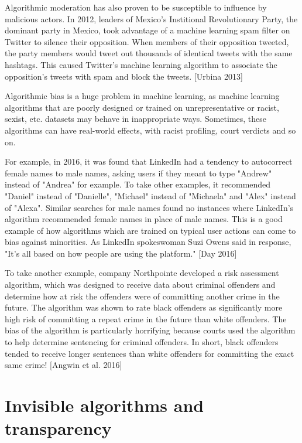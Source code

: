 \documentclass[class=book, crop=false]{standalone}
\begin{document}
Algorithmic moderation has also proven to be susceptible to influence by malicious actors. In 2012, leaders of Mexico's Institional Revolutionary Party, the dominant party in Mexico, took advantage of a machine learning spam filter on Twitter to silence their opposition. When members of their opposition tweeted, the party members would tweet out thousands of identical tweets with the same hashtags. This caused Twitter's machine learning algorithm to associate the opposition's tweets with spam and block the tweets. [Urbina 2013]

Algorithmic bias is a huge problem in machine learning, as machine learning algorithms that are poorly designed or trained on unrepresentative or racist, sexist, etc. datasets may behave in inappropriate ways. Sometimes, these algorithms can have real-world effects, with racist profiling, court verdicts and so on.

For example, in 2016, it was found that LinkedIn had a tendency to autocorrect female names to male names, asking users if they meant to type "Andrew" instead of "Andrea" for example. To take other examples, it recommended "Daniel" instead of "Danielle", "Michael" instead of "Michaela" and "Alex" instead of "Alexa". Similar searches for male names found no instances where LinkedIn's algorithm recommended female names in place of male names. This is a good example of how algorithms which are trained on typical user actions can come to bias against minorities. As LinkedIn spokeswoman Suzi Owens said in response, "It's all based on how people are using the platform." [Day 2016]

To take another example, company Northpointe developed a risk assessment algorithm, which was designed to receive data about criminal offenders and determine how at risk the offenders were of committing another crime in the future. The algorithm was shown to rate black offenders as significantly more high risk of committing a repeat crime in the future than white offenders. The bias of the algorithm is particularly horrifying because courts used the algorithm to help determine sentencing for criminal offenders. In short, black offenders tended to receive longer sentences than white offenders for committing the exact same crime! [Angwin et al. 2016]

\section{Invisible algorithms and transparency}
\end{document}
